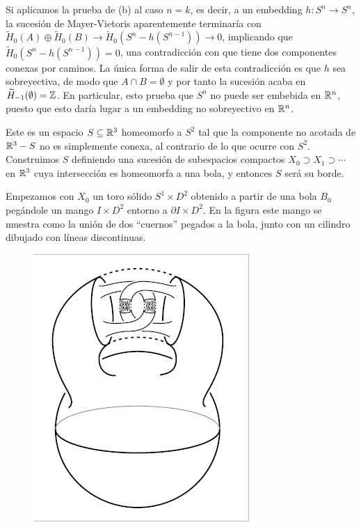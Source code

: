 \documentclass[TA.tex]{subfiles}
\begin{document}
Si aplicamos la prueba de (b) al caso $n=k$, es decir, a un embedding $h:S^n\to S^n$, la sucesión de Mayer-Vietoris aparentemente terminaría con $\widetilde{H}_0(A)\oplus \widetilde{H}_0(B)\to \widetilde{H}_0(S^n-h(S^{n-1}))\to 0$, implicando que $\widetilde{H}_0(S^n-h(S^{n-1}))=0$, una contradicción con que tiene dos componentes conexas por caminos. La única forma de salir de esta contradicción es que $h$ sea sobreyectiva, de modo que $A\cap B=\emptyset$ y por tanto la sucesión acaba en $\widetilde{H}_{-1}(\emptyset)=\mathbb{Z}$. En particular, esto prueba que $S^n$ no puede ser embebida en $\mathbb{R}^n$, puesto que esto daría lugar a un embedding no sobreyectivo en $\mathbb{R}^n$.


\begin{ej}
Este es un espacio $S\subseteq\mathbb{R}^3$ homeomorfo a $S^2$ tal que la componente no acotada de $\mathbb{R}^3-S$ no es simplemente conexa, al contrario de lo que ocurre con $S^2$. Construimos $S$ definiendo una sucesión de subespacios compactos $X_0\supset X_1\supset\cdots$ en $\mathbb{R}^3$ cuya intersección es homeomorfa a una bola, y entonces $S$ será su borde. 

Empezamos con $X_0$ un toro sólido $S^1\times D^2$ obtenido a partir de una bola $B_0$ pegándole un mango $I\times D^2$ entorno a $\partial I\times D^2$. En la figura este mango se muestra como la unión de dos ``cuernos'' pegados a la bola, junto con un cilindro dibujado con líneas discontinuas.

\begin{figure}
\includegraphics[scale=0.6]{horned}
\end{figure}


\end{ej}
\end{document}
